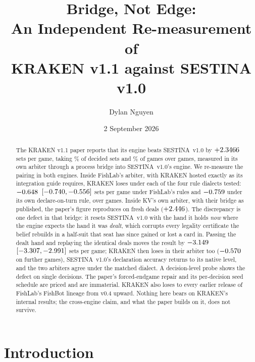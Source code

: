 \documentclass[11pt]{article}
\title{\textbf{Bridge, Not Edge:\\ An Independent Re-measurement of\\ KRAKEN v1.1 against SESTINA v1.0}}
\author{Dylan Nguyen}
\date{2 September 2026}
\newcommand{\sestina}{\mbox{SESTINA v1.0}}
\newcommand{\pct}{\%}
\begin{document}
\maketitle

\begin{abstract}
\noindent
The KRAKEN v1.1 paper reports that its engine beats \sestina{} by $+2.3466$ sets per game,
taking \kcMegaSetShare\pct{} of decided sets and \kcMegaWin\pct{} of games over \kcMegaN{} games,
measured in its own arbiter through a process bridge into \sestina{}'s engine. We re-measure the
pairing in both engines. Inside FishLab's arbiter, with KRAKEN hosted exactly as its integration guide
requires, KRAKEN loses under each of the four rule dialects tested: $-0.648$~$[-0.740, -0.556]$ sets per game under FishLab's rules and
$-0.759$ under its own declare-on-turn rule, over \kcESestinaGames{} games. Inside KV's own
arbiter, with their bridge as published, the paper's figure reproduces on fresh deals
($+2.446$). The discrepancy is one defect in that bridge: it resets \sestina{} with the hand
it holds \emph{now} where the engine expects the hand it was \emph{dealt}, which corrupts every
legality certificate the belief rebuilds in a half-suit that seat has since gained or lost a card in.
Passing the dealt hand and replaying the identical deals moves the result by $-3.149$~$[-3.307, -2.991]$ sets per game; KRAKEN then loses in their arbiter too
($-0.570$ on \kcVDealtBigGames{} further games), \sestina{}'s declaration accuracy returns
to its native level, and the two arbiters agree under the matched dialect. A decision-level probe shows
the defect on single decisions. The paper's forced-endgame repair and its per-decision seed schedule
are priced and are immaterial. KRAKEN also loses to every earlier release of FishLab's FishBot lineage
from v0.4 upward. Nothing here bears on KRAKEN's internal results; the cross-engine claim, and what the
paper builds on it, does not survive.
\end{abstract}

\section{Introduction}
\end{document}
